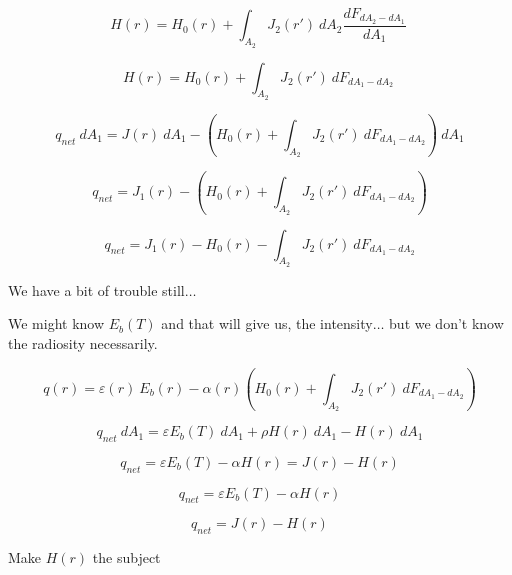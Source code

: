\documentclass[12pt]{article}
\renewcommand{\_}{\kern-1.5pt\textunderscore\kern-1.5pt}
\begin{document}
 \[ H \left( r \right)  =H_{0} \left( r \right)  + \int _{A_{2}}^{}J_{2} \left( r' \right) ~dA_{2}\frac{dF_{dA_{2}-dA_{1}}}{dA_{1}}~ \] \par

 \[ H \left( r \right)  =H_{0} \left( r \right)  + \int _{A_{2}}^{}J_{2} \left( r' \right) ~dF_{dA_{1}-dA_{2}}~ \] \par

 \[ q_{net}~dA_{1}=J \left( r \right) ~dA_{1}- \left( H_{0} \left( r \right)  + \int _{A_{2}}^{}J_{2} \left( r' \right) ~dF_{dA_{1}-dA_{2}} \right) ~dA_{1} \] \par

 \[ q_{net} =J_{1} \left( r \right)  - \left( H_{0} \left( r \right)  + \int _{A_{2}}^{}J_{2} \left( r' \right) ~dF_{dA_{1}-dA_{2}} \right)  \] \par

 \[ q_{net} =J_{1} \left( r \right)  -H_{0} \left( r \right) - \int _{A_{2}}^{}J_{2} \left( r' \right) ~dF_{dA_{1}-dA_{2}} \] \par

We have a bit of trouble still$ \ldots $ \par

We might know  \( E_{b} \left( T \right)  \)  and that will give us, the intensity$ \ldots $  but we don’t know the radiosity necessarily.\par

 \[ q \left( r \right) = \varepsilon  \left( r \right) ~E_{b} \left( r \right) - \alpha  \left( r \right)  \left( H_{0} \left( r \right)  + \int _{A_{2}}^{}J_{2} \left( r' \right) ~dF_{dA_{1}-dA_{2}} \right)  \] \par


\vspace{\baselineskip}
 \[ q_{net}~dA_{1}= \varepsilon  E_{b} \left( T \right) ~dA_{1}+ \rho H \left( r \right) ~dA_{1}-H \left( r \right) ~dA_{1} \] \par

 \[ q_{net} = \varepsilon  E_{b} \left( T \right) - \alpha H \left( r \right)  =J \left( r \right) -H \left( r \right)  \] \par

 \[ q_{net} = \varepsilon  E_{b} \left( T \right) - \alpha H \left( r \right)  \] \par

 \[ q_{net}=J \left( r \right) -H \left( r \right)  \] \par

Make  \( H \left( r \right)  \)  the subject\par
\end{document}
